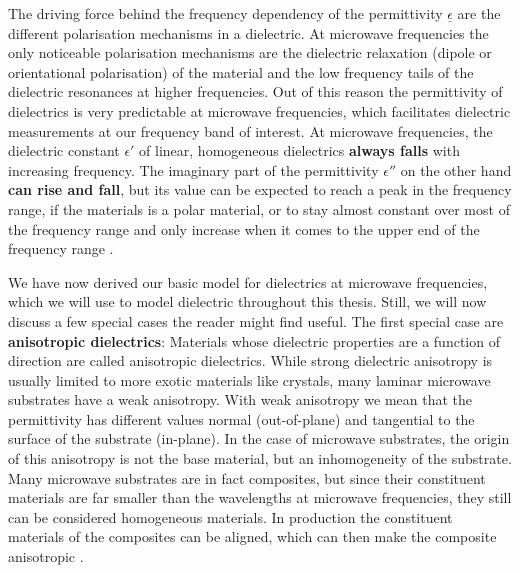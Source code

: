 The driving force behind the frequency dependency of the permittivity $\underline{\epsilon}$ are the different polarisation mechanisms in a dielectric. At microwave frequencies the only noticeable polarisation mechanisms are the dielectric relaxation (dipole or orientational polarisation) of the material and the low frequency tails of the dielectric resonances at higher frequencies. Out of this reason the permittivity of dielectrics is very predictable at microwave frequencies, which facilitates dielectric measurements at our frequency band of interest. At microwave frequencies, the dielectric constant $\epsilon'$ of linear, homogeneous dielectrics \textbf{always falls} with increasing frequency. The imaginary part of the permittivity $\epsilon''$ on the other hand \textbf{can rise and fall}, but its value can be expected to reach a peak in the frequency range, if the materials is a polar material, or to stay almost constant over most of the frequency range and only increase when it comes to the upper end of the frequency range \cite{NPL}.

We have now derived our basic model for dielectrics at microwave frequencies, which we will use to model dielectric throughout this thesis. Still, we will now discuss a few special cases the reader might find useful. The first special case are \textbf{anisotropic dielectrics}: Materials whose dielectric properties are a function of direction are called anisotropic dielectrics. While strong dielectric anisotropy is usually limited to more exotic materials like crystals, many laminar microwave substrates have a weak anisotropy. With weak anisotropy we mean that the permittivity has different values normal (out-of-plane) and tangential to the surface of the substrate (in-plane). In the case of microwave substrates, the origin of this anisotropy is not the base material, but an inhomogeneity of the substrate. Many microwave substrates are in fact composites, but since their constituent materials are far smaller than the wavelengths at microwave frequencies, they still can be considered homogeneous materials. In production the constituent materials of the composites can be aligned, which can then make the composite anisotropic \cite{dankov, NPL, horn}.

